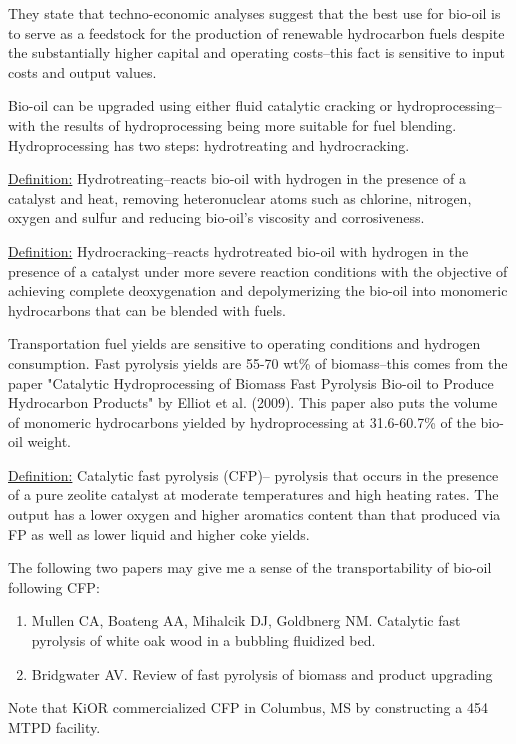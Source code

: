 \documentclass{article}\usepackage[]{graphicx}\usepackage[]{color}
\begin{document}
They state that techno-economic analyses suggest that the best use for bio-oil is to serve as a feedstock for the production of renewable hydrocarbon fuels despite the substantially higher capital and operating costs--this fact is sensitive to input costs and output values.

Bio-oil can be upgraded using either fluid catalytic cracking or hydroprocessing--with the results of hydroprocessing being more suitable for fuel blending.  Hydroprocessing has two steps: hydrotreating and hydrocracking.

\underline{Definition:} Hydrotreating--reacts bio-oil with hydrogen in the presence of a catalyst and heat, removing heteronuclear atoms such as chlorine, nitrogen, oxygen and sulfur and reducing bio-oil's viscosity and corrosiveness.

\underline{Definition:} Hydrocracking--reacts hydrotreated bio-oil with hydrogen in the presence of a catalyst under more severe reaction conditions with the objective of achieving complete deoxygenation and depolymerizing the bio-oil into monomeric hydrocarbons that can be blended with fuels.

Transportation fuel yields are sensitive to operating conditions and hydrogen consumption.  Fast pyrolysis yields are 55-70 wt\% of biomass--this comes from the paper "Catalytic Hydroprocessing of Biomass Fast Pyrolysis Bio-oil to Produce Hydrocarbon Products" by Elliot et al. (2009).  This paper also puts the volume of monomeric hydrocarbons yielded by hydroprocessing at 31.6-60.7\% of the bio-oil weight.

\underline{Definition:} Catalytic fast pyrolysis (CFP)-- pyrolysis that occurs in the presence of a pure zeolite catalyst at moderate temperatures and high heating rates.  The output has a lower oxygen and higher aromatics content than that produced via FP as well as lower liquid and higher coke yields.  

The following two papers may give me a sense of the transportability of bio-oil following CFP:

\begin{enumerate}
\item Mullen CA, Boateng AA, Mihalcik DJ, Goldbnerg NM.  Catalytic fast pyrolysis of white oak wood in a bubbling fluidized bed.
\item Bridgwater AV.  Review of fast pyrolysis of biomass and product upgrading
\end{enumerate}

Note that KiOR commercialized CFP in Columbus, MS by constructing a 454 MTPD facility.
\end{document}
